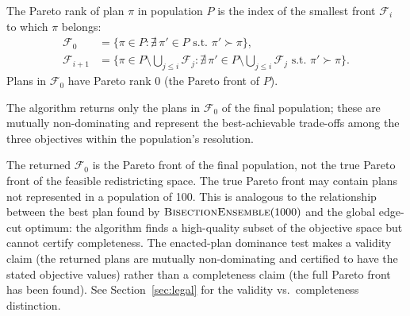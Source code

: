 \begin{definition}
\label{def:paretorank}
The Pareto rank of plan $\pi$ in population $P$ is the index of the smallest
front $\mathcal{F}_i$ to which $\pi$ belongs:
\begin{align*}
  \mathcal{F}_0 &= \{\pi \in P : \nexists\, \pi' \in P \text{ s.t.\ } \pi' \succ \pi\}, \\
  \mathcal{F}_{i+1} &= \{\pi \in P \setminus \bigcup_{j \leq i} \mathcal{F}_j :
    \nexists\, \pi' \in P \setminus \bigcup_{j \leq i} \mathcal{F}_j
    \text{ s.t.\ } \pi' \succ \pi\}.
\end{align*}
Plans in $\mathcal{F}_0$ have Pareto rank 0 (the Pareto front of $P$).
\end{definition}

The algorithm returns only the plans in $\mathcal{F}_0$ of the final
population; these are mutually non-dominating and represent the
best-achievable trade-offs among the three objectives within the
population's resolution.

\begin{remark}
\label{rem:population-limited}
The returned $\mathcal{F}_0$ is the Pareto front of the final \nsga{}
population, not the true Pareto front of the feasible redistricting space.
The true Pareto front may contain plans not represented in a population of
100.
This is analogous to the relationship between the best plan found by
$\textsc{BisectionEnsemble}{}(1000)$ and the global edge-cut optimum: the algorithm finds a
high-quality subset of the objective space but cannot certify completeness.
The enacted-plan dominance test makes a validity claim (the returned plans
are mutually non-dominating and certified to have the stated objective values)
rather than a completeness claim (the full Pareto front has been found).
See Section~\ref{sec:legal} for the validity vs.\ completeness distinction.
\end{remark}
